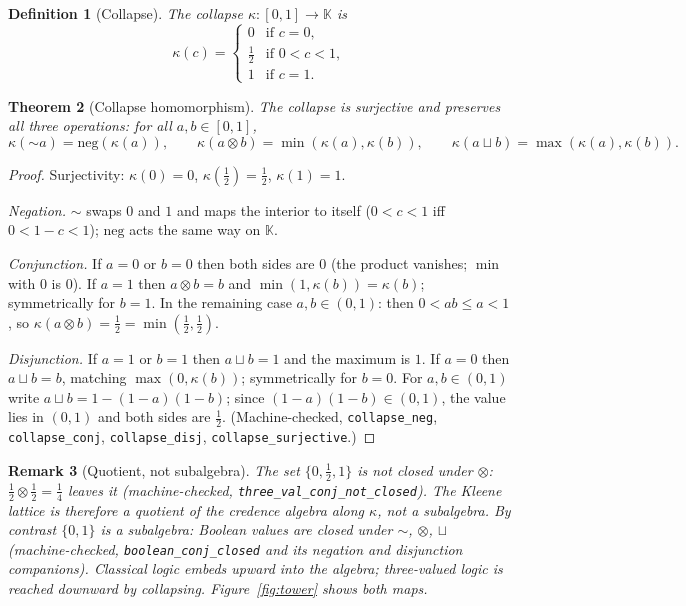 \documentclass[11pt,a4paper]{article}
\newtheorem{theorem}{Theorem}[section]
\newtheorem{definition}[theorem]{Definition}
\newtheorem{remark}[theorem]{Remark}
\newcommand{\negc}{\mathord{\sim}}
\newcommand{\conjc}{\otimes}
\newcommand{\disjc}{\sqcup}
\newcommand{\Kl}{\mathbb{K}}
\begin{document}
\begin{definition}[Collapse]
\label{def:collapse}
The \emph{collapse} $\kappa : [0,1] \to \Kl$ is
\[
\kappa(c) =
\begin{cases}
0 & \text{if } c = 0,\\
\tfrac{1}{2} & \text{if } 0 < c < 1,\\
1 & \text{if } c = 1.
\end{cases}
\]
\end{definition}

\begin{theorem}[Collapse homomorphism]
\label{thm:collapse-hom}
The collapse is surjective and preserves all three operations:
for all $a, b \in [0,1]$,
\[
\kappa(\negc a) = \mathrm{neg}(\kappa(a)),
\qquad
\kappa(a \conjc b) = \min(\kappa(a), \kappa(b)),
\qquad
\kappa(a \disjc b) = \max(\kappa(a), \kappa(b)).
\]
\end{theorem}

\begin{proof}
Surjectivity: $\kappa(0) = 0$, $\kappa(\tfrac{1}{2}) = \tfrac{1}{2}$,
$\kappa(1) = 1$.

\emph{Negation.}
$\negc$ swaps $0$ and $1$ and maps the interior to itself
($0 < c < 1$ iff $0 < 1 - c < 1$); $\mathrm{neg}$ acts the same way
on $\Kl$.

\emph{Conjunction.}
If $a = 0$ or $b = 0$ then both sides are $0$
(the product vanishes; $\min$ with $0$ is $0$).
If $a = 1$ then $a \conjc b = b$ and
$\min(1, \kappa(b)) = \kappa(b)$; symmetrically for $b = 1$.
In the remaining case $a, b \in (0,1)$:
then $0 < ab \leq a < 1$, so
$\kappa(a \conjc b) = \tfrac{1}{2} =
\min(\tfrac{1}{2}, \tfrac{1}{2})$.

\emph{Disjunction.}
If $a = 1$ or $b = 1$ then $a \disjc b = 1$ and the maximum is $1$.
If $a = 0$ then $a \disjc b = b$, matching
$\max(0, \kappa(b))$; symmetrically for $b = 0$.
For $a, b \in (0,1)$ write $a \disjc b = 1 - (1-a)(1-b)$;
since $(1-a)(1-b) \in (0,1)$, the value lies in $(0,1)$ and both
sides are $\tfrac{1}{2}$.
(Machine-checked, \texttt{collapse\_neg}, \texttt{collapse\_conj},
\texttt{collapse\_disj}, \texttt{collapse\_surjective}.)
\end{proof}

\begin{remark}[Quotient, not subalgebra]
\label{rem:not-subalgebra}
The set $\{0, \tfrac{1}{2}, 1\}$ is not closed under $\conjc$:
$\tfrac{1}{2} \conjc \tfrac{1}{2} = \tfrac{1}{4}$ leaves it
(machine-checked, \texttt{three\_val\_conj\_not\_closed}).
The Kleene lattice is therefore a \emph{quotient} of the credence
algebra along $\kappa$, not a subalgebra.
By contrast $\{0,1\}$ \emph{is} a subalgebra: Boolean values are
closed under $\negc$, $\conjc$, $\disjc$
(machine-checked, \texttt{boolean\_conj\_closed} and its negation and
disjunction companions).
Classical logic embeds upward into the algebra; three-valued logic is
reached downward by collapsing.
Figure~\ref{fig:tower} shows both maps.
\end{remark}
\end{document}
